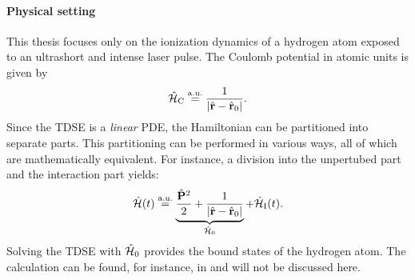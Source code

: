 \paragraph{Physical setting}
This thesis focuses only on the ionization dynamics of a hydrogen atom exposed to an ultrashort and intense laser pulse.
The Coulomb potential in atomic units is given by
\begin{equation*}
    \hat{\mathcal{H}}_{\mathrm{C}} \stackrel{\mathrm{a.u.}}{=} \frac{1}{|\hat{\mathbf{r}}-\hat{\mathbf{r}}_0|}.
\end{equation*}
Since the TDSE is a \emph{linear} PDE, the Hamiltonian can be partitioned into separate parts.
This partitioning can be performed in various ways, all of which are mathematically equivalent.
For instance, a division into the unpertubed part and the interaction part yields:
\begin{equation*}
    \hat{\mathcal{H}}(t) \stackrel{\mathrm{a.u.}}{=} \underbrace{\frac{\hat{\mathbf{P}}^2}{2}+\frac{1}{|\hat{\mathbf{r}}-\hat{\mathbf{r}}_0|}}_{\hat{\mathcal{H}}_0} + \hat{\mathcal{H}}_{\mathrm{I}}(t).
\end{equation*}
Solving the TDSE with $\hat{\mathcal{H}}_0$ provides the bound states of the hydrogen atom.
The calculation can be found, for instance, in \cite{sakurai} and will not be discussed here.




